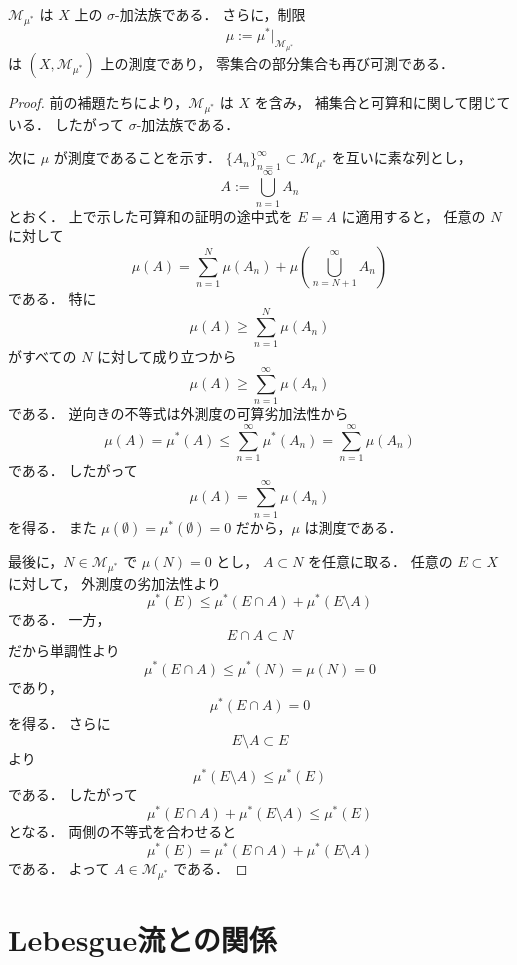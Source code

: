 \begin{theorem}[Carathéodory]
$\mathcal M_{\mu^*}$ は $X$ 上の $\sigma$-加法族である．
さらに，制限
\[
\mu:=\mu^*|_{\mathcal M_{\mu^*}}
\]
は $(X,\mathcal M_{\mu^*})$ 上の測度であり，
零集合の部分集合も再び可測である．
\end{theorem}
\begin{proof}
前の補題たちにより，$\mathcal M_{\mu^*}$ は $X$ を含み，
補集合と可算和に関して閉じている．
したがって $\sigma$-加法族である．

次に $\mu$ が測度であることを示す．
$\{A_n\}_{n=1}^{\infty}\subset \mathcal M_{\mu^*}$ を互いに素な列とし，
\[
A:=\bigcup_{n=1}^{\infty}A_n
\]
とおく．
上で示した可算和の証明の途中式を $E=A$ に適用すると，
任意の $N$ に対して
\[
\mu(A)
=
\sum_{n=1}^{N}\mu(A_n)
+\mu\left(\bigcup_{n=N+1}^{\infty}A_n\right)
\]
である．
特に
\[
\mu(A)\ge \sum_{n=1}^{N}\mu(A_n)
\]
がすべての $N$ に対して成り立つから
\[
\mu(A)\ge \sum_{n=1}^{\infty}\mu(A_n)
\]
である．
逆向きの不等式は外測度の可算劣加法性から
\[
\mu(A)=\mu^*(A)\le \sum_{n=1}^{\infty}\mu^*(A_n)=\sum_{n=1}^{\infty}\mu(A_n)
\]
である．
したがって
\[
\mu(A)=\sum_{n=1}^{\infty}\mu(A_n)
\]
を得る．
また $\mu(\emptyset)=\mu^*(\emptyset)=0$ だから，$\mu$ は測度である．

最後に，$N \in \mathcal M_{\mu^*}$ で $\mu(N)=0$ とし，
$A \subset N$ を任意に取る．
任意の $E \subset X$ に対して，
外測度の劣加法性より
\[
\mu^*(E)\le \mu^*(E\cap A)+\mu^*(E\setminus A)
\]
である．
一方，
\[
E\cap A \subset N
\]
だから単調性より
\[
\mu^*(E\cap A)\le \mu^*(N)=\mu(N)=0
\]
であり，
\[
\mu^*(E\cap A)=0
\]
を得る．
さらに
\[
E\setminus A \subset E
\]
より
\[
\mu^*(E\setminus A)\le \mu^*(E)
\]
である．
したがって
\[
\mu^*(E\cap A)+\mu^*(E\setminus A)\le \mu^*(E)
\]
となる．
両側の不等式を合わせると
\[
\mu^*(E)=\mu^*(E\cap A)+\mu^*(E\setminus A)
\]
である．
よって $A \in \mathcal M_{\mu^*}$ である．
\end{proof}

\section{Lebesgue流との関係}

